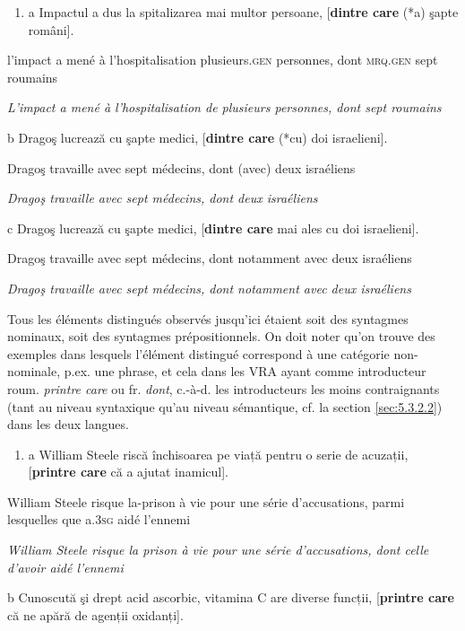 \begin{enumerate}
\item \label{bkm:Ref292982403}a  Impactul a dus la spitalizarea mai multor persoane, [\textbf{dintre care} (*a) şapte români]. 


\end{enumerate}
l'impact a mené à l'hospitalisation plusieurs\textsc{.gen} personnes, dont \textsc{mrq.gen} sept roumains 

  \textit{L'impact a mené à l'hospitalisation de plusieurs personnes, dont sept roumains } 

  b  Dragoş lucrează cu şapte medici, [\textbf{dintre care} (*cu) doi israelieni].

    Dragoş travaille avec sept médecins, dont (avec) deux israéliens

    \textit{Dragoş travaille avec sept médecins, dont deux israéliens}

  c  Dragoş lucrează cu şapte medici, [\textbf{dintre care} mai ales cu doi israelieni].

    Dragoş travaille avec sept médecins, dont notamment avec deux israéliens

    \textit{Dragoş travaille avec sept médecins, dont notamment avec deux israéliens}

Tous les éléments distingués observés jusqu'ici étaient soit des syntagmes nominaux, soit des syntagmes prépositionnels. On doit noter qu'on trouve des exemples dans lesquels l'élément distingué correspond à une catégorie non-nominale, p.ex. une phrase, et cela dans les VRA ayant comme introducteur roum. \textit{printre care} ou fr. \textit{dont}, c.-à-d. les introducteurs les moins contraignants (tant au niveau syntaxique qu'au niveau sémantique, cf. la section \ref{sec:5.3.2.2}) dans les deux langues.


\begin{enumerate}
\item a  William Steele riscă închisoarea pe viață pentru o serie de acuzații, [\textbf{printre care} că a ajutat inamicul].  


\end{enumerate}
William Steele risque la-prison à vie pour une série d'accusations, parmi lesquelles que a.3\textsc{sg} aidé l'ennemi

{\itshape
William Steele risque la prison à vie pour une série d'accusations, dont celle d'avoir aidé l'ennemi } 

  b  Cunoscută şi drept acid ascorbic, vitamina C are diverse funcții, [\textbf{printre care} că ne apără de agenții oxidanți].

